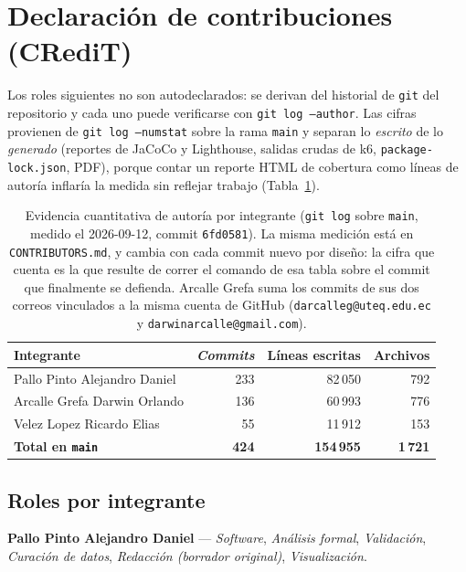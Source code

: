 \documentclass[11pt,a4paper]{article}
\newcommand{\ruta}[1]{\texttt{\footnotesize #1}}
\begin{document}
\section{Declaración de contribuciones (CRediT)}
\label{sec:credit}

Los roles siguientes no son autodeclarados: se derivan del historial de
\texttt{git} del repositorio y cada uno puede verificarse con
\texttt{git log --author}. Las cifras provienen de \texttt{git log
--numstat} sobre la rama \texttt{main} y separan lo \emph{escrito} de lo
\emph{generado} (reportes de JaCoCo y Lighthouse, salidas crudas de k6,
\texttt{package-lock.json}, PDF), porque contar un reporte HTML de
cobertura como líneas de autoría inflaría la medida sin reflejar trabajo
(Tabla~\ref{tab:credit-cifras}).

\begin{table}[htbp]
\centering
\caption{Evidencia cuantitativa de autoría por integrante (\texttt{git log} sobre \texttt{main}, medido el 2026-09-12, commit \texttt{6fd0581}). La misma medición está en \ruta{CONTRIBUTORS.md}, y cambia con cada commit nuevo por diseño: la cifra que cuenta es la que resulte de correr el comando de esa tabla sobre el commit que finalmente se defienda. Arcalle Grefa suma los commits de sus dos correos vinculados a la misma cuenta de GitHub (\texttt{darcalleg@uteq.edu.ec} y \texttt{darwinarcalle@gmail.com}).}
\label{tab:credit-cifras}
\begin{tabular}{@{}lrrr@{}}
\toprule
\textbf{Integrante} & \textbf{\emph{Commits}} & \textbf{Líneas escritas} & \textbf{Archivos} \\
\midrule
Pallo Pinto Alejandro Daniel & 233 & 82\,050 & 792 \\
Arcalle Grefa Darwin Orlando & 136 & 60\,993 & 776 \\
Velez Lopez Ricardo Elias & 55 & 11\,912 & 153 \\
\midrule
\textbf{Total en \texttt{main}} & \textbf{424} & \textbf{154\,955} & \textbf{1\,721} \\
\bottomrule
\end{tabular}
\end{table}

\subsection{Roles por integrante}

\textbf{Pallo Pinto Alejandro Daniel} — \emph{Software}, \emph{Análisis
formal}, \emph{Validación}, \emph{Curación de datos}, \emph{Redacción
(borrador original)}, \emph{Visualización}.
\end{document}
